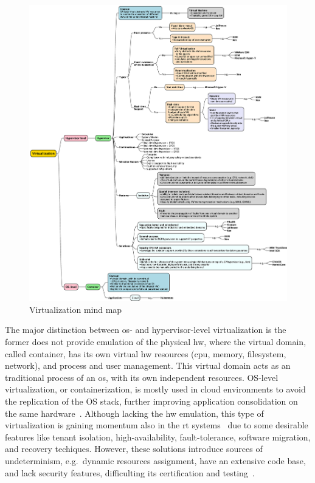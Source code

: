 \begin{figure}[!hbt]
  \centering
  \includegraphics[width=1.0\textwidth]{./img/eps/virt-mindmap.eps} 
%   
  \caption{Virtualization mind map}%
  \label{fig:virt-mindmap}
\end{figure}

The major distinction between \gls{os}- and hypervisor-level virtualization is
the former does not provide emulation of the physical \gls{hw}, where the
virtual domain, called container, has its own virtual \gls{hw} resources
(\gls{cpu}, memory, filesystem, network), and process and user management. This
virtual domain acts as an traditional process of an \gls{os}, with its own
independent resources. OS-level virtualization, or containerization, is mostly
used in cloud environments to avoid the replication of the OS stack, further
improving application consolidation on the same
hardware~\cite{cinque2022virtualizing}. Although lacking the \gls{hw} emulation, this
type of virtualization is gaining momentum also in the \gls{rt} systems~\cite{xilinxRunX,struhar2020real} due to
some desirable features like tenant isolation, high-availability,
fault-tolerance, software migration, and recovery techiques. However, these
solutions introduce sources of undeterminism, e.g.~dynamic resources assignment,
have an extensive code base, and lack security features, difficulting its
certification and testing~\cite{cinque2022virtualizing}.

